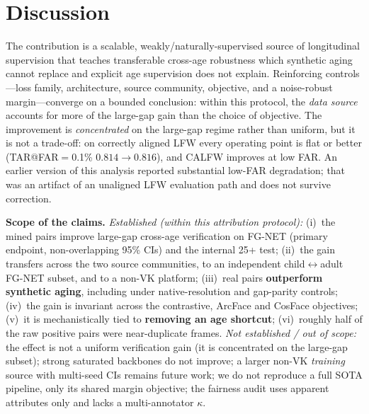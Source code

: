 \documentclass[letterpaper]{article} %
\begin{document}
\section{Discussion}\label{sec:discussion}
The contribution is a scalable, weakly/naturally-supervised source of longitudinal supervision that teaches transferable cross-age robustness which synthetic aging cannot replace and explicit age supervision does not explain. Reinforcing controls---loss family, architecture, source community, objective, and a noise-robust margin---converge on a bounded conclusion: within this protocol, the \emph{data source} accounts for more of the large-gap gain than the choice of objective. The improvement is \emph{concentrated} on the large-gap regime rather than uniform, but it is not a trade-off: on correctly aligned LFW every operating point is flat or better (TAR@FAR$=$0.1\% $0.814 \rightarrow 0.816$), and CALFW improves at low FAR. An earlier version of this analysis reported substantial low-FAR degradation; that was an artifact of an unaligned LFW evaluation path and does not survive correction.

\textbf{Scope of the claims.} \emph{Established (within this attribution protocol):} (i)~the mined pairs improve large-gap cross-age verification on FG-NET (primary endpoint, non-overlapping 95\% CIs) and the internal 25+ test; (ii)~the gain transfers across the two source communities, to an independent child$\leftrightarrow$adult FG-NET subset, and to a non-VK platform; (iii)~real pairs \textbf{outperform synthetic aging}, including under native-resolution and gap-parity controls; (iv)~the gain is invariant across the contrastive, ArcFace and CosFace objectives; (v)~it is mechanistically tied to \textbf{removing an age shortcut}; (vi)~roughly half of the raw positive pairs were near-duplicate frames. \emph{Not established / out of scope:} the effect is not a uniform verification gain (it is concentrated on the large-gap subset); strong saturated backbones do not improve; a larger non-VK \emph{training} source with multi-seed CIs remains future work; we do not reproduce a full SOTA pipeline, only its shared margin objective; the fairness audit uses apparent attributes only and lacks a multi-annotator $\kappa$.
\end{document}
